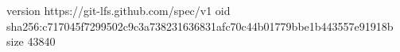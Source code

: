 version https://git-lfs.github.com/spec/v1
oid sha256:c717045f7299502c9c3a738231636831afc70c44b01779bbe1b443557e91918b
size 43840

